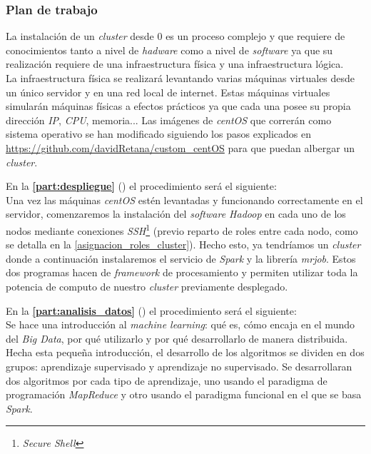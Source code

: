 \subsubsection*{Plan de trabajo}
La instalación de un \textit{cluster} desde 0 es un proceso complejo y que requiere de conocimientos tanto a nivel de 
\textit{hadware} como a nivel de \textit{software} ya que su realización requiere de una infraestructura física 
y una infraestructura lógica.\\
La infraestructura física se realizará levantando varias máquinas virtuales desde un único servidor y en una red local
de internet. Estas máquinas virtuales simularán máquinas físicas a efectos prácticos ya que cada una posee su propia
dirección \textit{IP}, \textit{CPU}, memoria...
Las imágenes de \textit{centOS} que correrán como sistema operativo se han modificado siguiendo los pasos explicados
en \url{https://github.com/davidRetana/custom_centOS} para que puedan albergar un \textit{cluster}.
\newline

\noindent En la \textbf{\autoref{part:despliegue}} () el procedimiento será el siguiente:\\
Una vez las máquinas \textit{centOS} estén levantadas y funcionando correctamente en el servidor, comenzaremos la
instalación del \textit{software Hadoop} en cada uno de los nodos mediante conexiones 
\textit{SSH}\footnote{\textit{Secure Shell}} (previo reparto de roles entre cada nodo, como se detalla en
la \autoref{asignacion_roles_cluster}).
Hecho esto, ya tendríamos un \textit{cluster} donde a continuación instalaremos el servicio de \textit{Spark} y la 
librería \textit{mrjob}. Estos dos programas hacen de \textit{framework} de procesamiento y permiten utilizar
toda la potencia de computo de nuestro \textit{cluster} previamente desplegado.
\newline

\noindent En la \textbf{\autoref{part:analisis_datos}} () el procedimiento será el siguiente:\\
Se hace una introducción al \textit{machine learning}: qué es, cómo encaja en el mundo del \textit{Big Data},
por qué utilizarlo y por qué desarrollarlo de manera distribuida.\\
Hecha esta pequeña introducción, el desarrollo de los algoritmos se dividen en dos grupos: aprendizaje supervisado
y aprendizaje no supervisado. Se desarrollaran dos algoritmos por cada tipo de aprendizaje, uno usando el
paradigma de programación \textit{MapReduce} y otro usando el paradigma funcional en el que se basa \textit{Spark}.


